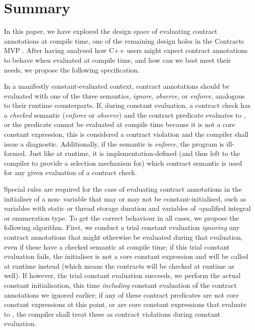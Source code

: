 \section{Summary}

In this paper, we have explored the design space of evaluating contract annotations at compile time, one of the remaining design holes in the Contracts MVP \cite{P2900R3}. After having analysed how C++ users might expect contract annotations to behave when evaluated at compile time, and how can we best meet their needs, we propose the following specification.

In a manifestly constant-evaluated context, contract annotations should be evaluated with one of the three semantics, \emph{ignore}, \emph{observe}, or \emph{enforce}, analogous to their runtime counterparts. If, during constant evaluation, a contract check has a \emph{checked} semantic (\emph{enforce} or \emph{observe}) and the contract predicate evaluates to , or the predicate cannot be evaluated at compile time because it is not a core constant expression, this is considered a contract violation and the compiler shall issue a diagnostic. Additionally, if the semantic is \emph{enforce}, the program is ill-formed. Just like at runtime, it is implementation-defined (and thus left to the compiler to provide a selection mechanism for) which contract semantic is used for any given evaluation of a contract check.

Special rules are required for the case of evaluating contract annotations in the initialiser of a non- variable that may or may not be constant-initialised, such as variables with static or thread storage duration and variables of -qualified integral or enumeration type. To get the correct behaviour in all cases, we propose the following algorithm. First, we conduct a trial constant evaluation \emph{ignoring} any contract annotations that might otherwise be evaluated during that evaluation, even if these have a checked semantic at compile time; if this trial constant evaluation fails, the initialiser is not a core constant expression and will be called at runtime instead (which means the contracts will be checked at runtime as well). If however, the trial constant evaluation succeeds, we perform the actual constant initialisation, this time \emph{including} constant evaluation of the contract annotations we ignored earlier; if any of these contract predicates are not core constant expressions at this point, or are core constant expressions that evaluate to , the compiler shall treat these as contract violations during constant evaluation.


